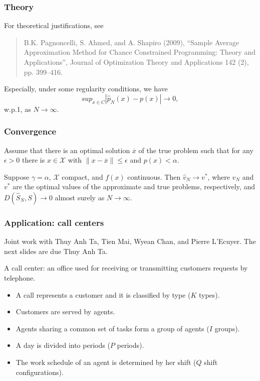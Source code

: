 \documentclass{beamer}
\begin{document}
\begin{frame}
	\frametitle{Theory}
	
	For theoretical justifications, see
	\begin{quote}
		B.K. Pagnoncelli, S. Ahmed, and A. Shapiro (2009), ``Sample Average Approximation Method for Chance
		Constrained Programming: Theory and Applications'', Journal of Optimization Theory and Applications 142 (2), pp. 399--416.
	\end{quote}
	
	\mbox{}
	
	Especially, under some regularity conditions, we have
	\[
	sup_{x \in C} |\hat{p}_N(x) - p(x)| \rightarrow 0,
	\]
	w.p.1, as $N \rightarrow \infty$.
	
\end{frame}

\begin{frame}
	\frametitle{Convergence}
	
	Assume that  there is an optimal solution $\overline{x}$ of the true problem such that for any $\epsilon > 0$ there is $x \in \mathcal{X}$ with $\| x - \overline{x} \| \leq \epsilon$ and $p(x) < \alpha$.
	
	\mbox{}
	
	\begin{theorem}
		Suppose $\gamma = \alpha$, $\mathcal{X}$ compact, and $f(x)$ continuous.
		Then $\hat{v}_N \rightarrow v^*$, where $\hat{v}_N$ and $v^*$ are the optimal values of the approximate and true problems, respectively, and $D(\hat{S}_N,S) \rightarrow 0$ almost surely as $N \rightarrow \infty$.
	\end{theorem}
	
\end{frame}

\begin{frame}
	\frametitle{Application: call centers}
	
	Joint work with Thuy Anh Ta, Tien Mai, Wyean Chan, and Pierre L'Ecuyer.
	The next slides are due Thuy Anh Ta.
	
	\mbox{}
	
	{\color{red}A call center}: an  office used for receiving or transmitting customers requests by {\color{red}telephone}.
	
	
	\begin{itemize}
		\item A {\color{blue}call} represents a customer and it is classified by {\color{blue}type} ($K$ types). 
		\item Customers are served by {\color{blue}agents}.
		\item Agents sharing a common set of tasks form a {\color{blue}group} of agents ($I$ groups).
		\item A day is divided into {\color{blue}periods} ($P$ periods).
		\item The work schedule of an agent is determined by her {\color{blue}shift} ($Q$ shift configurations).
	\end{itemize}
	
\end{frame}
\end{document}
